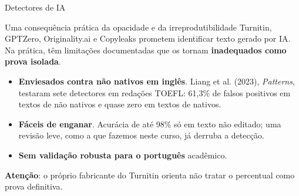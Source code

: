 \documentclass[11pt,aspectratio=169,t]{beamer}
\begin{document}
\begin{frame}{Detectores de IA}
  \small
  \begin{alertblock}{Uma consequência prática da opacidade e da irreprodutibilidade}
    Turnitin, GPTZero, Originality.ai e Copyleaks prometem identificar texto gerado por IA. Na prática, têm limitações documentadas que os tornam \textbf{inadequados como prova isolada}.
  \end{alertblock}
  \pause
  \begin{itemize}
    \item \textbf{Enviesados contra não nativos em inglês}. Liang et al. (2023), \textit{Patterns}, testaram sete detectores em redações TOEFL: \alert{61,3\% de falsos positivos} em textos de não nativos e quase zero em textos de nativos.
    \item \textbf{Fáceis de enganar}. Acurácia de até 98\% só em texto não editado; uma revisão leve, como a que fazemos neste curso, já derruba a detecção.
    \item \textbf{Sem validação robusta para o português} acadêmico.
  \end{itemize}
  \pause
  \vspace{0.05cm}
  \centering \textbf{Atenção}: o próprio fabricante do Turnitin orienta não tratar o percentual como prova definitiva.
\end{frame}
\end{document}

